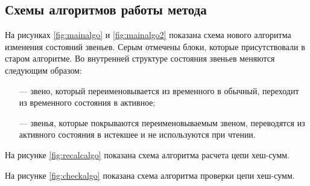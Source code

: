 \subsection{Схемы алгоритмов работы метода}

На рисунках \ref{fig:mainalgo} и \ref{fig:mainalgo2} показана схема нового алгоритма изменения состояний звеньев. Серым отмечены блоки, которые присутствовали в старом алгоритме. Во внутренней структуре состояния звеньев меняются следующим образом:
\begin{itemize}
	\item [---] звено, который переименовывается из временного в обычный, переходит из временного состояния в активное;
	\item [---] звенья, которые покрываются переименовываемым звеном, переводятся из активного состояния в истекшее и не используются при чтении.
\end{itemize}

На рисунке \ref{fig:recalcalgo} показана схема алгоритма расчета цепи хеш-сумм.

На рисунке \ref{fig:checkalgo} показана схема алгоритма проверки цепи хеш-сумм.

\pagebreak

